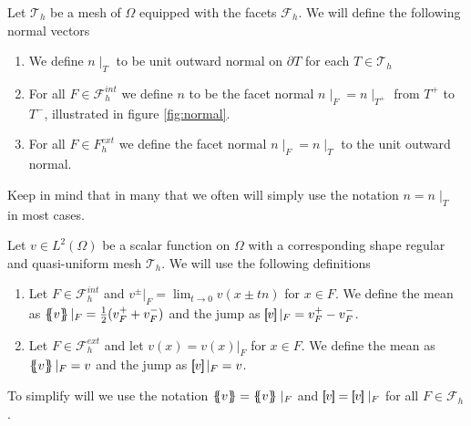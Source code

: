 \begin{definition}
Let $\mathcal{T}_{h} $ be a mesh of $\Omega $ equipped with the facets $\mathcal{F}_{h} $. We will define the following normal vectors
\begin{enumerate}[label=\arabic*)]
    \item We define $n \mid _{T}$ to be unit outward normal on $\partial T$ for each $T \in \mathcal{T}_{h} $
 \item For all $F \in \mathcal{F }^{int} _{h}$ we define $n$ to be the facet normal $ n  \mid_F = n \mid _{T^{+}} $  from $T^{+}$ to $T^{-}$, illustrated in figure \ref{fig:normal}.
 \item For all $F \in F^{ext}_{h}$ we define the facet normal $n \mid _{F} = n \mid _{T} $ to the unit outward normal.
\end{enumerate}
Keep in mind that in many that we often will simply use the notation $n = n \mid _{T}$ in most cases.
\end{definition}

\begin{definition}
    Let $v\in L^2( \Omega ) $ be a scalar function on $\Omega$ with a corresponding shape regular and quasi-uniform mesh $\mathcal{T}_{h} $. We will use the following definitions
    \begin{enumerate}[label=\arabic*)]
        \item Let $F \in \mathcal{F}^{int} _{h}$ and $v^{\pm}| _{F} = \lim_{t\to 0} v( x \pm tn)   $ for $x \in F$. We define the mean as $\left\{\!\!\left\{ v\right\}\!\!\right\} |_{F} = \frac{1}{2} (v^{+}_{F} + v^{-}_{F})   $ and the jump as $\left[\!\!\left[ v \right]\!\!\right]|_{F} =  v^{+}_{F} - v^{-}_{F} $.
        \item Let $F \in \mathcal{F}^{ext} _{h}$ and let $ v( x) =  v(x)|_{F} $ for  $x \in F$.
We define the mean as $\left\{\!\!\left\{ v\right\}\!\!\right\} |_{F} = v    $ and the jump as $\left[\!\!\left[ v \right]\!\!\right]|_{F} = v$.

    \end{enumerate}
    To simplify will we use the notation $\mean{ v } = \mean{ v } \mid _{F}    $ and $\jump{ v } = \jump{ v } \mid _{F}    $ for all $F \in \mathcal{F} _{h}$.

\end{definition}




